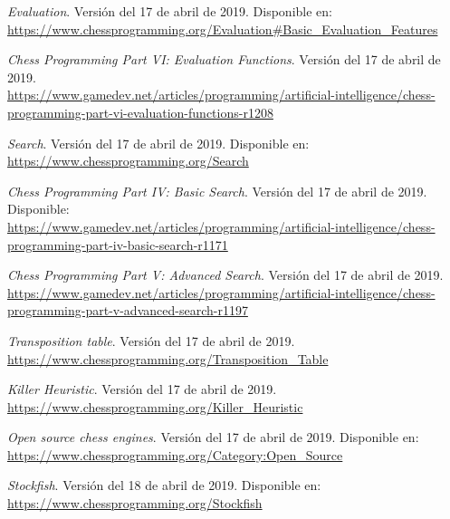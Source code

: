 \documentclass[letterpaper,12pt]{article}
\begin{document}
\begin{thebibliography}{99}
\textit{Evaluation}. Versión del 17 de abril de 2019. Disponible en: \\
\url{https://www.chessprogramming.org/Evaluation#Basic_Evaluation_Features}

\textit{Chess Programming Part VI: Evaluation Functions}. Versión del 17 de abril de 2019.
\\ \url{https://www.gamedev.net/articles/programming/artificial-intelligence/chess-programming-part-vi-evaluation-functions-r1208}

\textit{Search}. Versión del 17 de abril de 2019. Disponible en: \\
\url{https://www.chessprogramming.org/Search}

\textit{Chess Programming Part IV: Basic Search}. Versión del 17 de abril de 2019.
Disponible: \\ \url{https://www.gamedev.net/articles/programming/artificial-intelligence/chess-programming-part-iv-basic-search-r1171}

\textit{Chess Programming Part V: Advanced Search}. Versión del 17 de abril de 2019. \\
\url{https://www.gamedev.net/articles/programming/artificial-intelligence/chess-programming-part-v-advanced-search-r1197}

\textit{Transposition table}. Versión del 17 de abril de 2019. \\
\url{https://www.chessprogramming.org/Transposition_Table}

\textit{Killer Heuristic}. Versión del 17 de abril de 2019. \\
\url{https://www.chessprogramming.org/Killer_Heuristic}


\textit{Open source chess engines}. Versión del 17 de abril de 2019. Disponible en: \\
\url{https://www.chessprogramming.org/Category:Open_Source}

\textit{Stockfish}. Versión del 18 de abril de 2019. Disponible en: \\
\url{https://www.chessprogramming.org/Stockfish}

\end{thebibliography}
\end{document}
